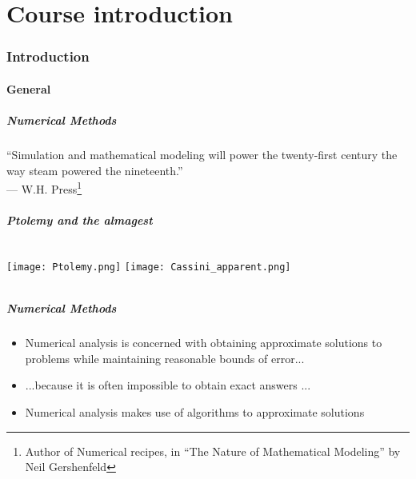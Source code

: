 \part{Course introduction}
\section{Introduction}
\subsection*{General}

\begin{frame}
 \frametitle{Numerical Methods}
 \renewcommand{\thefootnote}{$\star$} 
  {\LARGE ``Simulation and mathematical modeling will power the twenty-first century the way steam powered the nineteenth.''\\
   {\vspace{1em}\hspace{2em} --- W.H. Press\footnote{Author of Numerical recipes, in ``The Nature of Mathematical Modeling'' by Neil Gershenfeld }}} \\
  \vspace{-1cm}
  \flushright{}
\end{frame}

\begin{frame}
 \frametitle{Ptolemy and the almagest}
 \begin{columns}
   \centering
     \texttt{[image: Ptolemy.png]}
   \centering
     \texttt{[image: Cassini\_apparent.png]}   
 \end{columns} \vspace{1em}
\end{frame}

\begin{frame}
 \frametitle{Numerical Methods}
 \begin{itemize}
  \item Numerical analysis is concerned with obtaining approximate solutions to problems while maintaining reasonable bounds of error...
  \item ...because it is often impossible to obtain exact answers ...
  \item Numerical analysis makes use of algorithms to
approximate solutions
 \end{itemize}
\end{frame}

